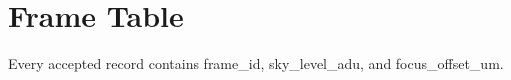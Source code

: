 \documentclass{article}
\begin{document}
\section{Frame Table}
\begin{definition}
\label{tab:frames}
Every accepted record contains frame_id, sky_level_adu, and focus_offset_um.
\end{definition}
\end{document}
